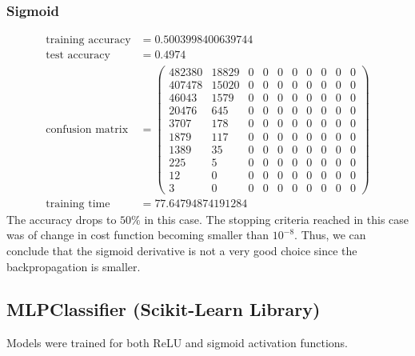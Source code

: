 \documentclass[11pt]{article}
\begin{document}
\subsubsection{Sigmoid}
\begin{equation}
  \begin{split}
    \text{training accuracy} &= 0.5003998400639744\\
    \text{test accuracy} &= 0.4974\\
    \text{confusion matrix} &=
    \begin{pmatrix}
      482380 & 18829 & 0 & 0 & 0 & 0 & 0 & 0 & 0 & 0 \\
      407478 & 15020 & 0 & 0 & 0 & 0 & 0 & 0 & 0 & 0 \\
      46043  & 1579  & 0 & 0 & 0 & 0 & 0 & 0 & 0 & 0 \\
      20476  & 645   & 0 & 0 & 0 & 0 & 0 & 0 & 0 & 0 \\
      3707   & 178   & 0 & 0 & 0 & 0 & 0 & 0 & 0 & 0 \\
      1879   & 117   & 0 & 0 & 0 & 0 & 0 & 0 & 0 & 0 \\
      1389   & 35    & 0 & 0 & 0 & 0 & 0 & 0 & 0 & 0 \\
      225    & 5     & 0 & 0 & 0 & 0 & 0 & 0 & 0 & 0 \\
      12     & 0     & 0 & 0 & 0 & 0 & 0 & 0 & 0 & 0 \\
      3      & 0     & 0 & 0 & 0 & 0 & 0 & 0 & 0 & 0
    \end{pmatrix}\\
    \text{training time} &= 77.64794874191284
  \end{split}
\end{equation}
The accuracy drops to $50\%$ in this case. The stopping criteria reached in this case was of change in cost function becoming smaller than $10^{-8}$. Thus, we can conclude that the sigmoid derivative is not a very good choice since the backpropagation is smaller.

\subsection{MLPClassifier (Scikit-Learn Library)}
Models were trained for both ReLU and sigmoid activation functions.
\end{document}
